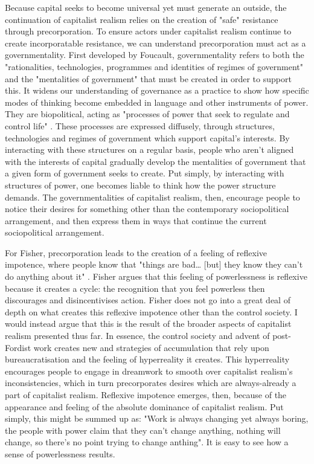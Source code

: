 Because capital seeks to become universal yet must generate an outside, the continuation of capitalist realism relies on the creation of "safe" resistance through precorporation. To ensure actors under capitalist realism continue to create incorporatable resistance, we can understand precorporation must act as a governmentality. First developed by Foucault, governmentality refers to both the "rationalities, technologies, programmes and identities of regimes of government" and the "mentalities of government" \citep[p. 24]{dean_governmentality_2010} that must be created in order to support this. It widens our understanding of governance as a practice to show how specific modes of thinking become embedded in language and other instruments of power.  They are biopolitical, acting as "processes of power that seek to regulate and control life" \citep[p. 50]{lemke_biopolitics:_2011}. These processes are expressed diffusely, through structures, technologies and regimes of government which support capital's interests. By interacting with these structures on a regular basis, people who aren't aligned with the interests of capital gradually develop the mentalities of government that a given form of government seeks to create. Put simply, by interacting with structures of power, one becomes liable to think how the power structure demands. The governmentalities of capitalist realism, then, encourage people to notice their desires for something other than the contemporary sociopolitical arrangement, and then express them in ways that continue the current sociopolitical arrangement. 


For Fisher, precorporation leads to the creation of a feeling of reflexive impotence, where people know that "things are bad\ldots{} [but] they know they can't do anything about it" \citep[p. 24]{fisher_capitalist_2009}. Fisher argues that this feeling of powerlessness is reflexive because it creates a cycle: the recognition that you feel powerless then discourages and disincentivises action. Fisher does not go into a great deal of depth on what creates this reflexive impotence other than the control society. I would instead argue that this is the result of the broader aspects of capitalist realism presented thus far. In essence, the control society and advent of post-Fordist work creates new  and strategies of accumulation that rely upon bureaucratisation and the feeling of hyperreality it creates. This hyperreality encourages people to engage in dreamwork to smooth over capitalist realism's inconsistencies, which in turn precorporates desires which are always-already a part of capitalist realism. Reflexive impotence emerges, then, because of the appearance and feeling of the absolute dominance of capitalist realism. Put simply, this might be summed up as: "Work is always changing yet always boring, the people with power claim that they can't change anything, nothing will change, so there's no point trying to change anthing". It is easy to see how a sense of powerlessness results.

